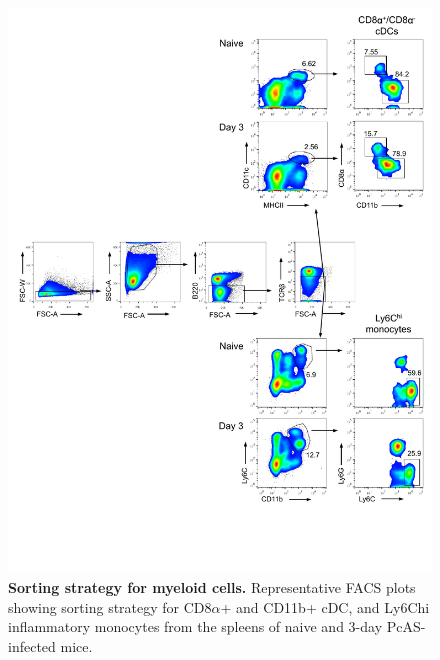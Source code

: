 \begin{figure}
    \centering
    \includegraphics[width=\textwidth]{"Fig S20 rev3"}
    \caption[Sorting strategy for myeloid cells]{\textbf{Sorting strategy for myeloid cells.} Representative FACS plots showing sorting strategy for CD8\( \alpha \)+ and CD11b+ cDC, and Ly6Chi inflammatory monocytes from the spleens of naive and 3-day PcAS-infected mice.}
    \label{fig:ms20}
\end{figure}

